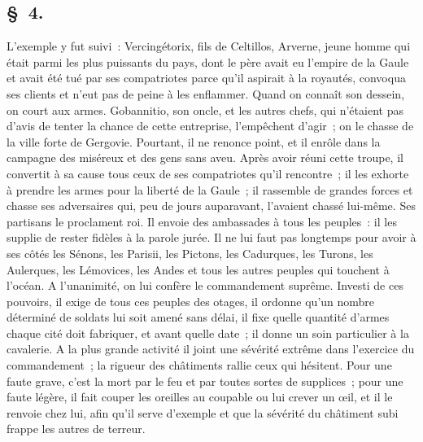 \documentclass[french,twoside]{book} %
\begin{document}
\subsection[{§ 4.}]{ \textsc{§ 4.} }
\noindent L'exemple y fut suivi : Vercingétorix, fils de Celtillos, Arverne, jeune homme qui était parmi les plus puissants du pays, dont le père avait eu l’empire de la Gaule et avait été tué par ses compatriotes parce qu’il aspirait à la royautés, convoqua ses clients et n’eut pas de peine à les enflammer. Quand on connaît son dessein, on court aux armes. Gobannitio, son oncle, et les autres chefs, qui n’étaient pas d’avis de tenter la chance de cette entreprise, l’empêchent d’agir ; on le chasse de la ville forte de Gergovie. Pourtant, il ne renonce point, et il enrôle dans la campagne des miséreux et des gens sans aveu. Après avoir réuni cette troupe, il convertit à sa cause tous ceux de ses compatriotes qu’il rencontre ; il les exhorte à prendre les armes pour la liberté de la Gaule ; il rassemble de grandes forces et chasse ses adversaires qui, peu de jours auparavant, l’avaient chassé lui-même. Ses partisans le proclament roi. Il envoie des ambassades à tous les peuples : il les supplie de rester fidèles à la parole jurée. Il ne lui faut pas longtemps pour avoir à ses côtés les Sénons, les Parisii, les Pictons, les Cadurques, les Turons, les Aulerques, les Lémovices, les Andes et tous les autres peuples qui touchent à l’océan. A l’unanimité, on lui confère le commandement suprême. Investi de ces pouvoirs, il exige de tous ces peuples des otages, il ordonne qu’un nombre déterminé de soldats lui soit amené sans délai, il fixe quelle quantité d’armes chaque cité doit fabriquer, et avant quelle date ; il donne un soin particulier à la cavalerie. A la plus grande activité il joint une sévérité extrême dans l’exercice du commandement ; la rigueur des châtiments rallie ceux qui hésitent. Pour une faute grave, c’est la mort par le feu et par toutes sortes de supplices ; pour une faute légère, il fait couper les oreilles au coupable ou lui crever un œil, et il le renvoie chez lui, afin qu’il serve d’exemple et que la sévérité du châtiment subi frappe les autres de terreur.
\end{document}

